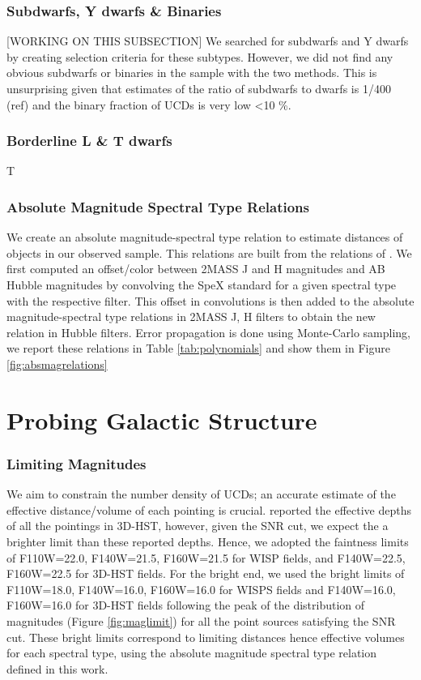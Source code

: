 \documentclass[manuscript]{aastex63}
\begin{document}
\subsubsection{ Subdwarfs, Y dwarfs  \& Binaries}

[WORKING ON THIS SUBSECTION]
We searched for subdwarfs and Y dwarfs by creating selection criteria for these subtypes. However, we did not find any obvious subdwarfs or binaries in the sample with the two methods. This is unsurprising given that estimates of the ratio of subdwarfs to dwarfs is 1/400 (ref) and the binary fraction of UCDs is very low \textless 10 \%. 

\subsubsection{Borderline L \& T dwarfs }

T

\subsubsection{ Absolute Magnitude  Spectral Type Relations }

We create an absolute magnitude-spectral type relation to estimate distances of objects in our observed sample. This relations are built from the relations of \cite{2012ApJS..201...19D}. We first computed an offset/color between 2MASS J and H magnitudes and AB Hubble magnitudes by convolving the SpeX standard for a given spectral type with the respective filter. This offset {}in convolutions is then added to the absolute magnitude-spectral type relations in 2MASS J, H filters to obtain the new relation in Hubble filters. Error propagation is done using Monte-Carlo sampling, we report these relations in Table \ref{tab:polynomials} and show them in Figure \ref{fig:absmagrelations}


\section{Probing Galactic Structure}\label{sec:simulations}

\subsubsection{ Limiting Magnitudes}
We aim to constrain the number density of UCDs; an accurate estimate of the effective distance/volume of each pointing is crucial.  \citealt{Momcheva2016} reported the effective depths of all the pointings in 3D-HST, however, given the SNR cut, we expect the a brighter limit than these reported depths. Hence, we adopted the faintness limits of F110W=22.0, F140W=21.5, F160W=21.5 for WISP fields, and  F140W=22.5, F160W=22.5 for 3D-HST fields. For the bright end, we used the bright limits of F110W=18.0, F140W=16.0, F160W=16.0 for WISPS fields and F140W=16.0, F160W=16.0 for 3D-HST fields following the peak of the distribution of magnitudes (Figure \ref{fig:maglimit}) for all the point sources satisfying the SNR cut. These bright limits correspond to limiting distances hence effective volumes for each spectral type, using the absolute magnitude spectral type relation defined in this work. 
\end{document}
